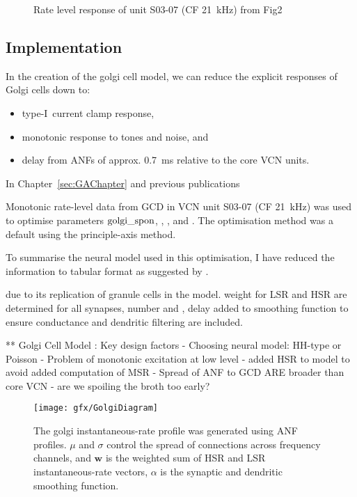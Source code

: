 \begin{figure}[htb]
  \centering
{}
\caption{Rate level response of unit S03-07 (CF 21~kHz) from Fig2
  \citep{GhoshalKim:1997} }
\end{figure}


\newpage
\subsection{Implementation}
\vspace{1ex}


In the creation of the golgi cell model, we can reduce the explicit
responses of Golgi cells down to:\begin{itemize}\setlength{\itemsep}{-1em}
\item type-I~current clamp response,
\item monotonic response to tones and noise, and
\item delay from ANFs of approx. 0.7~ms relative to the core VCN units.
\end{itemize}

In Chapter~\ref{sec:GAChapter} and previous publications \citep{EagerGraydenEtAl:2006a}


Monotonic rate-level data from GCD in VCN \citep{GhoshalKim:1996} unit S03-07
(CF 21~kHz) was used to optimise parameters ${\rm golgi\_spon}$, \wLSRGLG,
\wHSRGLG, and  \sANFGLG\@.  The optimisation method was a default  using the principle-axis method.


To summarise the neural model used in this optimisation, I have
reduced the information to tabular format as suggested by
\citet{NordlieGewaltigEtAl:2009}.



due to its replication of granule cells in the model. weight for LSR \wLSRGLG and HSR \wHSRGLG are determined  for all synapses, number \nLSRDS and \nHSRDS, delay \dANFGLG added to smoothing function to ensure conductance and dendritic filtering are included.

** Golgi Cell Model :  Key design factors
 - Choosing neural model: HH-type or Poisson
 - Problem of monotonic excitation at low level
  - added HSR to model to avoid added computation of MSR
 - Spread of ANF to GCD ARE broader than core VCN
  - are we spoiling the broth too early? 


\begin{figure}[hp!]
  \centering
  \texttt{[image: gfx/GolgiDiagram]}
  \caption{ The golgi instantaneous-rate profile was generated using ANF
    profiles. $\mu$ and $\sigma$ control the spread of connections
    across frequency channels, and $\mathbf{w}$ is
    the weighted sum of HSR and LSR instantaneous-rate vectors,
    $\alpha$ is the synaptic and dendritic smoothing function.}
\end{figure}


